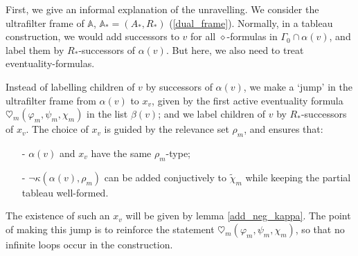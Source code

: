 \documentclass[11pt]{article}
\newcommand{\A}{{\mathbb A}}
\begin{document}
First, we give an informal explanation of the unravelling. We consider the ultrafilter frame of $\A$, $\A_*=(A_*,R_*)$ (\ref{dual_frame}). Normally, in a tableau construction, we would add successors to $v$ for all $\diamond$-formulas in $\Gamma_0\cap\alpha(v)$, and label them by $R_*$-successors of $\alpha(v)$. But here, we also need to treat eventuality-formulas.

Instead of labelling children of $v$ by successors of $\alpha(v)$, we make a `jump' in the ultrafilter frame from $\alpha(v)$ to $x_v$, given by the first active eventuality formula $\heartsuit_m(\varphi_m,\psi_m,\chi_m)$ in the list $\beta(v)$; and we label children of $v$ by $R_*$-successors of $x_v$. The choice of $x_v$ is guided by the relevance set $\rho_m$, and ensures that:
\begin{itemize}
    \item[-]$\alpha(v)$ and $x_v$ have the same $\rho_m$-type;
    \item[-]$\neg\kappa(\alpha(v),\rho_m)$ can be added conjuctively to $\tilde{\chi}_m$ while keeping the partial tableau well-formed.  
\end{itemize}
The existence of such an $x_v$ will be given by lemma \ref{add_neg_kappa}. The point of making this jump is to reinforce the statement $\heartsuit_m(\varphi_m,\psi_m,\chi_m)$, so that no infinite loops occur in the construction.
\end{document}
